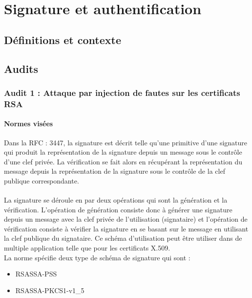 \chapter{Signature et authentification}
\section{Définitions et contexte}

\section{Audits}
	\subsection{Audit 1 : Attaque par injection de fautes sur les certificats RSA}
		\subsubsection{Normes visées}
Dans la RFC : 3447, la signature est décrit telle qu'une primitive d'une signature qui produit la représentation de la signature depuis un message sous le contrôle d'une clef privée. La vérification se fait alors en récupérant la représentation du message depuis la représentation de la signature sous le contrôle de la clef publique correspondante.
\\
\\ La signature se déroule en par deux opérations qui sont la génération et la vérification. L'opération de génération consiste donc à générer une signature depuis un message avec la clef privée de l'utilisation (signataire) et l'opération de vérification consiste à vérifier la signature en se basant sur le message en utilisant la clef publique du signataire. 
Ce schéma d'utilisation peut être utiliser dans de multiple application telle que pour les certificats X.509. 
\\
La norme spécifie deux type de schéma de signature qui sont :
\begin{itemize}
\item RSASSA-PSS
\item RSASSA-PKCS1-v1\_5 \\
\end{itemize}

